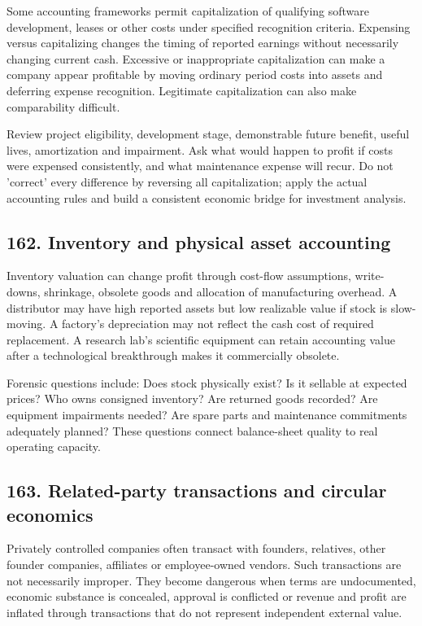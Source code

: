 Some accounting frameworks permit capitalization of qualifying software development, leases or other costs under specified recognition criteria. Expensing versus capitalizing changes the timing of reported earnings without necessarily changing current cash. Excessive or inappropriate capitalization can make a company appear profitable by moving ordinary period costs into assets and deferring expense recognition. Legitimate capitalization can also make comparability difficult.

Review project eligibility, development stage, demonstrable future benefit, useful lives, amortization and impairment. Ask what would happen to profit if costs were expensed consistently, and what maintenance expense will recur. Do not 'correct' every difference by reversing all capitalization; apply the actual accounting rules and build a consistent economic bridge for investment analysis.

\subsection{162. Inventory and physical asset accounting}


Inventory valuation can change profit through cost-flow assumptions, write-downs, shrinkage, obsolete goods and allocation of manufacturing overhead. A distributor may have high reported assets but low realizable value if stock is slow-moving. A factory's depreciation may not reflect the cash cost of required replacement. A research lab's scientific equipment can retain accounting value after a technological breakthrough makes it commercially obsolete.

Forensic questions include: Does stock physically exist? Is it sellable at expected prices? Who owns consigned inventory? Are returned goods recorded? Are equipment impairments needed? Are spare parts and maintenance commitments adequately planned? These questions connect balance-sheet quality to real operating capacity.

\subsection{163. Related-party transactions and circular economics}


Privately controlled companies often transact with founders, relatives, other founder companies, affiliates or employee-owned vendors. Such transactions are not necessarily improper. They become dangerous when terms are undocumented, economic substance is concealed, approval is conflicted or revenue and profit are inflated through transactions that do not represent independent external value.

